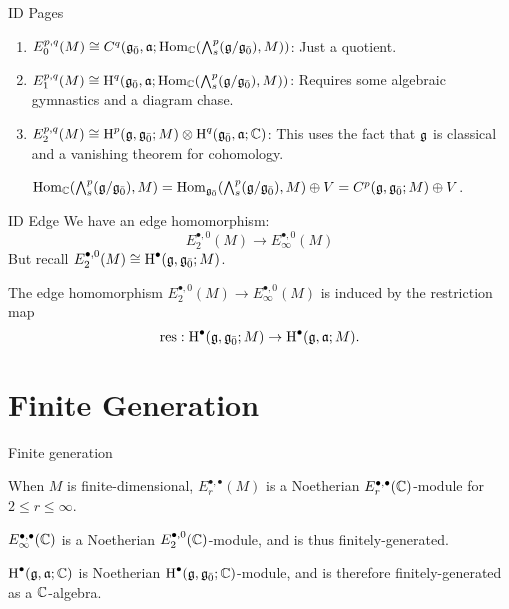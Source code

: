 \documentclass[handout]{beamer}
\begin{document}
\begin{frame}{ID Pages}
  \begin{enumerate}
  \pause\item $E_0^{p,q}(M) \cong C^q({\mathfrak{g}}_{\bar{0}},\mathfrak{a};\operatorname{Hom}_{\mathbb{C}}(\bigwedge\nolimits^{p}_s(\mathfrak{g}/{\mathfrak{g}}_{\bar{0}}),M))$: Just a quotient.
    \vspace{0.2in}
  \pause\item $E_1^{p,q}(M) \cong \operatorname{H}^q({\mathfrak{g}}_{\bar{0}},\mathfrak{a};\operatorname{Hom}_{\mathbb{C}}(\bigwedge\nolimits^{p}_s(\mathfrak{g}/{\mathfrak{g}}_{\bar{0}}),M))$: Requires some algebraic gymnastics and a diagram chase.
    \vspace{0.2in}
  \pause\item $E_2^{p,q}(M) \cong \operatorname{H}^p(\mathfrak{g},{\mathfrak{g}}_{\bar{0}};M) \otimes \operatorname{H}^q({\mathfrak{g}}_{\bar{0}},\mathfrak{a};\mathbb{C})$: This uses the fact that $\mathfrak{g}$ is classical and a vanishing theorem for cohomology.
    
   $\operatorname{Hom}_{\mathbb{C}}(\bigwedge\nolimits^{p}_s(\mathfrak{g}/{\mathfrak{g}}_{\bar{0}}),M) = \operatorname{Hom}_{{\mathfrak{g}}_{\bar{0}}}(\bigwedge\nolimits^{p}_s(\mathfrak{g}/{\mathfrak{g}}_{\bar{0}}),M) \oplus V = C^p(\mathfrak{g},{\mathfrak{g}}_{\bar{0}};M) \oplus V$. 
  \end{enumerate}
\end{frame}

\begin{frame}{ID Edge}
  \pause
  We have an edge homomorphism:
  \[
    {E_2^{\bullet,0}(M)} \to E_\infty^{\bullet,0}(M)
  \]\pause
  But recall $E_2^{\bullet,0}(M) \cong \operatorname{H}^\bullet(\mathfrak{g},{\mathfrak{g}}_{\bar{0}};M)$.
\pause
  \begin{theorem}
    The edge homomorphism $E_2^{\bullet,0}(M) \to E_\infty^{\bullet,0}(M)$ is induced by the restriction map
    \[
      \operatorname{res}:\operatorname{H}^\bullet(\mathfrak{g},{\mathfrak{g}}_{\bar{0}};M) \to \operatorname{H}^\bullet(\mathfrak{g},\mathfrak{a};M).
    \]
    
  \end{theorem}
\end{frame}

\section{Finite Generation}

\begin{frame}{Finite generation}
  \pause
  \begin{theorem}
    When $M$ is finite-dimensional, $E_r^{\bullet,\bullet}(M)$ is a Noetherian $E_r^{\bullet,\bullet}(\mathbb{C})$-module for $2 \leq r \leq \infty$.
  \end{theorem}
  \pause
  \begin{corollary}
    $E_\infty^{\bullet,\bullet}(\mathbb{C})$ is a Noetherian $E_2^{\bullet,0}(\mathbb{C})$-module, and is thus finitely-generated.
  \end{corollary}
  \pause
  \begin{corollary}
    $\operatorname{H}^\bullet(\mathfrak{g},\mathfrak{a};\mathbb{C})$ is Noetherian $\operatorname{H}^\bullet(\mathfrak{g},{\mathfrak{g}}_{\bar{0}};\mathbb{C})$-module, and is therefore finitely-generated as a $\mathbb{C}$-algebra.
  \end{corollary}
\end{frame}
\end{document}
